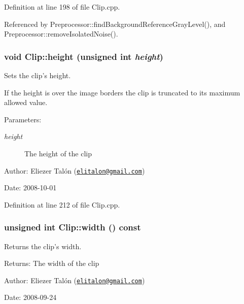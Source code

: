 Definition at line 198 of file Clip.cpp.

Referenced by Preprocessor::findBackgroundReferenceGrayLevel(), and Preprocessor::removeIsolatedNoise().\hypertarget{class_clip_c6eeb473cb104e6e3f90f4099c7ef741}{
\subsubsection[height]{\setlength{\rightskip}{0pt plus 5cm}void Clip::height (unsigned int {\em height})}}
\label{class_clip_c6eeb473cb104e6e3f90f4099c7ef741}


Sets the clip's height. 

If the height is over the image borders the clip is truncated to its maximum allowed value.

\begin{Desc}
\item[Parameters:]
\begin{description}
\item[{\em height}]The height of the clip\end{description}
\end{Desc}
\begin{Desc}
\item[Author:]Eliezer Talón (\href{mailto:elitalon@gmail.com}{\tt elitalon@gmail.com}) \end{Desc}
\begin{Desc}
\item[Date:]2008-10-01 \end{Desc}


Definition at line 212 of file Clip.cpp.\hypertarget{class_clip_d3e816599913e4051e5d50fae17ecd76}{
\subsubsection[width]{\setlength{\rightskip}{0pt plus 5cm}unsigned int Clip::width () const}}
\label{class_clip_d3e816599913e4051e5d50fae17ecd76}


Returns the clip's width. 

\begin{Desc}
\item[Returns:]The width of the clip\end{Desc}
\begin{Desc}
\item[Author:]Eliezer Talón (\href{mailto:elitalon@gmail.com}{\tt elitalon@gmail.com}) \end{Desc}
\begin{Desc}
\item[Date:]2008-09-24 \end{Desc}


